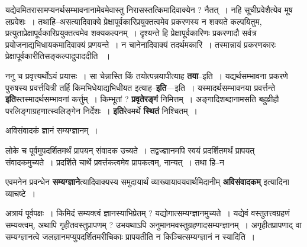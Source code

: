 \documentclass[article,12pt,a4paper]{memoir}
\begin{document}
	  \pstart यद्येवमितरासामप्यनर्थसम्भावनानामेवमेवास्तु निरासस्तत्किमादिवाक्येन ? नैतत् । नहि सूचीप्रवेशैत्येव मूष लप्रवेशः । तथाहि--असत्यादिवाक्ये प्रेक्षापूर्वकारिप्रयुक्तत्वमेव प्रकरणस्य न शक्यते कल्पयितुम, प्रत्युताप्रेक्षापूर्वकारिप्रयुक्तत्वमेव शक्यकल्पनम् । दृश्यन्ते हि प्रेक्षापूर्वकारिणः प्रकरणादौ सर्वत्र प्रयोजनाद्यभिधायकमादिवाक्यं प्रणयन्ते । न चानेनादिवाक्यं तदर्थमकारि । तस्मान्नायं प्रकरणकारः प्रेक्षापूर्वकारीतिसङ्कल्पादुपाददीति  ।
	\pend
      

	  \pstart ननु च प्रवृत्त्यर्थोऽयं प्रयासः । सा चेन्नास्ति किं तयोत्पन्नयापीत्याह \textbf{तया}--इति । यद्यर्थसम्भावना प्रकरणे पुरुषस्य प्रवर्त्तयित्री तर्हि किमभिधेयाद्यभिधीयत इत्याह--\textbf{इति}—इति । यस्मादर्थसम्भावनया प्रवर्त्तन्ते \textbf{इति}स्तस्मादर्थसम्भावनां कर्त्तुम् । किम्भूतां ? \textbf{प्रवृतेरङ्गं} निमित्तम् । अङ्गादिशब्दानामसति बहुव्रीहौ परलिङ्गाग्रहणात्स्वलिङ्गेन निर्देशः । \textbf{इति}रेवमर्थे \textbf{स्थितं} निश्चितम् ।
	\pend
	  \bigskip
	  \begingroup
	

	  \pstart अविसंवादकं ज्ञानं सम्यग्ज्ञानम् ।
	\pend
        

	  \pstart {}लोके च पूर्वमुपदर्शितमर्थं प्रापयन् संवादक उच्यते । तद्वज्ज्ञानमपि स्वयं प्रदर्शितमर्थं प्रापयत् संवादकमुच्यते । प्रदर्शिते चार्थे प्रवर्त्तकत्वमेव प्रापकत्वम्, नान्यत् । तथा हि--न
	\pend
      
	  \endgroup
	

	  \pstart एवमनेन प्रवन्धेन \textbf{सम्यग्ज्ञाने}त्यादिवाक्यस्य समुदायार्थं व्याख्यायावयवार्थमिदानीम् \textbf{अविसंवादकम्} इत्यादिना व्याचष्टे ।
	\pend
      

	  \pstart अत्रायं पूर्वपक्षः । किमिदं सम्यक्त्वं ज्ञानस्याभिप्रेतम् ? यद्योगात्सम्यग्ज्ञानमुच्यते । यद्येवं वस्तुतत्त्वग्रहणं सम्यक्त्वम्, अथापि गृहीतवस्तुप्रापणम् ? उभयथाऽपि अनुमानमवस्तुग्रहणादसम्यग्ज्ञानम् । अगृहीतप्रापणाद् वा सम्यग्ज्ञानत्वे जलज्ञानमप्युपदर्शितमरीचिकाः प्रापयतीति न किञ्चित्सम्यग्ज्ञानं न स्यादिति ।
	\pend
      
\end{document}
